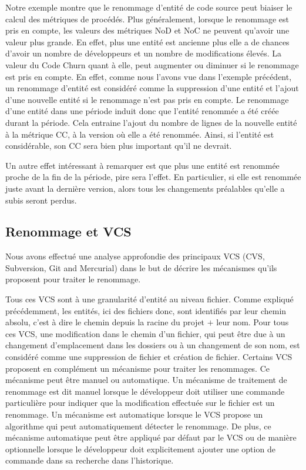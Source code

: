Notre exemple montre que le renommage d'entité de code source peut biaiser le calcul des métriques de procédés. Plus généralement, lorsque le renommage est pris en compte, les valeurs des métriques NoD et NoC ne peuvent qu'avoir une valeur plus grande. En effet, plus une entité est ancienne plus elle a de chances d'avoir un nombre de développeurs et un nombre de modifications élevés. La valeur du Code Churn quant à elle, peut augmenter ou diminuer si le renommage est pris en compte. En effet, comme nous l'avons vue dans l'exemple précédent, un renommage d'entité est considéré comme la suppression d'une entité et l'ajout d'une nouvelle entité si le renommage n'est pas pris en compte. Le renommage d'une entité dans une période induit donc que l'entité renommée a été créée durant la période. Cela entraine l'ajout du nombre de lignes de la nouvelle entité à la métrique CC, à la version où elle a été renommée. Ainsi, si l'entité est considérable, son CC sera bien plus important qu'il ne devrait. 

Un autre effet intéressant à remarquer est que plus une entité est renommée proche de la fin de la période, pire sera l'effet. En particulier, si elle est renommée juste avant la dernière version, alors tous les changements préalables qu'elle a subis seront perdus.\\

\subsection{Renommage et VCS}
  
Nous avons effectué une analyse approfondie des principaux VCS (CVS, Subversion, Git and Mercurial) dans le but de décrire les mécanismes qu'ils proposent pour traiter le renommage. 

Tous ces VCS sont à une granularité d'entité au niveau fichier. Comme expliqué précédemment, les entités, ici des fichiers donc, sont identifiés par leur chemin absolu, c'est à dire le chemin depuis la racine du projet $+$ leur nom. Pour tous ces VCS, une modification dans le chemin d'un fichier, qui peut être due à un changement d'emplacement dans les dossiers ou à un changement de son nom, est considéré comme une suppression de fichier et création de fichier. Certains VCS proposent en complément un mécanisme pour traiter les renommages. Ce mécanisme peut être manuel ou automatique. Un mécanisme de traitement de renommage est dit manuel lorsque le développeur doit utiliser une commande particulière pour indiquer que la modification effectuée sur le fichier est un renommage. Un mécanisme est automatique lorsque le VCS propose un algorithme qui peut automatiquement détecter le renommage. De plus, ce mécanisme automatique peut être appliqué par défaut par le VCS ou de manière optionnelle lorsque le développeur doit explicitement ajouter une option de commande dans sa recherche dans l'historique.\\
 
